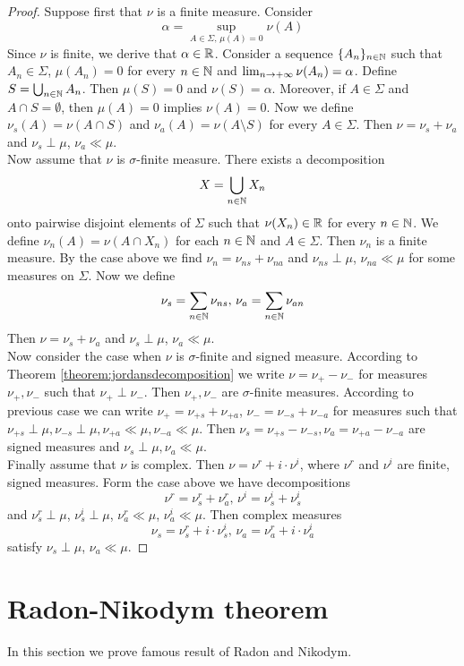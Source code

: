 \begin{proof}
Suppose first that $\nu$ is a finite measure. Consider
$$\alpha = \sup_{A\in \Sigma,\,\mu(A)=0}\nu(A)$$
Since $\nu$ is finite, we derive that $\alpha \in {\mathbb R}$. Consider a sequence $\{A_n\}_{n\in {\mathbb N}}$ such that $A_n\in \Sigma$, $\mu(A_n)=0$ for every $n\in {\mathbb N}$ and $\lim_{n\rightarrow +\infty}\nu(A_n)=\alpha$. Define $S = \bigcup_{n\in {\mathbb N}}A_n$. Then $\mu(S) = 0$ and $\nu(S) = \alpha$. Moreover, if $A\in \Sigma$ and $A\cap S = \emptyset$, then $\mu(A) = 0$ implies $\nu(A) = 0$. Now we define $\nu_s(A) = \nu(A\cap S)$ and $\nu_a(A) = \nu(A\setminus S)$ for every $A\in \Sigma$. Then $\nu = \nu_s+\nu_a$ and $\nu_s \perp \mu$, $\nu_a \ll \mu$.\\
Now assume that $\nu$ is $\sigma$-finite measure. There exists a decomposition
$$X = \bigcup_{n\in {\mathbb N}}X_n$$
onto pairwise disjoint elements of $\Sigma$ such that $\nu(X_n)\in {\mathbb R}$ for every $n\in {\mathbb N}$. We define $\nu_n(A) = \nu(A\cap X_n)$ for each $n\in {\mathbb N}$ and $A\in \Sigma$. Then $\nu_n$ is a finite measure. By the case above we find $\nu_n = \nu_{ns}+ \nu_{na}$ and $\nu_{ns}\perp \mu$, $\nu_{na} \ll \mu$ for some measures on $\Sigma$. Now we define
$$\nu_s = \sum_{n\in {\mathbb N}}\nu_{ns},\,\nu_a=\sum_{n\in {\mathbb N}}\nu_{an}$$
Then $\nu = \nu_s+\nu_a$ and $\nu_s \perp \mu$, $\nu_a \ll \mu$.\\
Now consider the case when $\nu$ is $\sigma$-finite and signed measure. According to Theorem \ref{theorem:jordansdecomposition} we write $\nu = \nu_+-\nu_-$ for measures $\nu_+,\nu_-$ such that $\nu_+\perp \nu_-$. Then $\nu_+,\nu_-$ are $\sigma$-finite measures. According to previous case we can write $\nu_+ = \nu_{+s}+\nu_{+a}$, $\nu_- = \nu_{-s} + \nu_{-a}$ for measures such that $\nu_{+s} \perp \mu,\nu_{-s} \perp \mu,\nu_{+a}\ll \mu,\nu_{-a}\ll\mu$. Then $\nu_s = \nu_{+s} - \nu_{-s}, \nu_a=\nu_{+a}-\nu_{-a}$ are signed measures and $\nu_s \perp \mu, \nu_a\ll\mu$.\\
Finally assume that $\nu$ is complex. Then $\nu = \nu^r + i\cdot \nu^i$, where $\nu^r$ and $\nu^i$ are finite, signed measures. Form the case above we have decompositions
$$\nu^r = \nu^r_s+\nu^r_a,\,\nu^i=\nu^i_s+\nu^i_s$$
and $\nu^r_s \perp \mu$, $\nu^i_s \perp \mu$, $\nu^r_a \ll\mu$, $\nu^i_a \ll \mu$. Then complex measures 
$$\nu_s = \nu^r_s+i\cdot \nu^i_s,\,\nu_a = \nu^r_a+i\cdot \nu^i_a$$
satisfy $\nu_s \perp \mu$, $\nu_a \ll \mu$.
\end{proof}

\section{Radon-Nikodym theorem}
\noindent
In this section we prove famous result of Radon and Nikodym.

